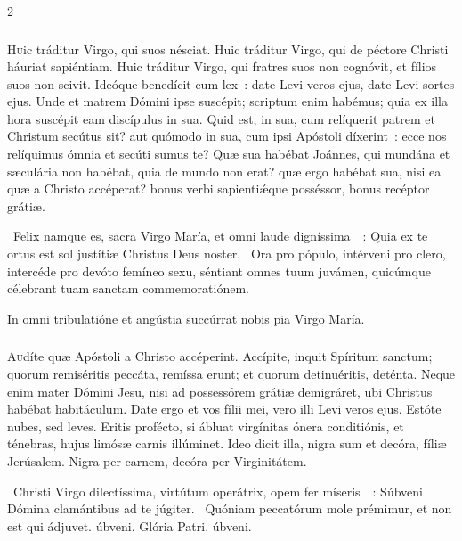 \documentclass[9pt,twoside]{extarticle}
\begin{document}
\begin{multicols}{2}
{\subsubsection*{\center {}}
\lettrine{H}uic tráditur Virgo, qui suos nésciat. Huic tráditur Virgo, qui de péctore Christi háuriat sapiéntiam. Huic tráditur Virgo, qui fratres suos non cognóvit, et fílios suos non scivit. Ideóque benedícit eum lex~: date Levi veros ejus, date Levi sortes ejus. Unde et matrem Dómini ipse suscépit; scriptum enim habémus; quia ex illa hora suscépit eam discípulus in sua. Quid est, in sua, cum relíquerit patrem et Christum secútus sit? aut quómodo in sua, cum ipsi Apóstoli díxerint~: ecce nos relíquimus ómnia et secúti sumus te? Quæ sua habébat Joánnes, qui mundána et sæculária non habébat, quia de mundo non erat? quæ ergo habébat sua, nisi ea quæ a Christo accéperat? bonus verbi sapientiǽque posséssor, bonus recéptor grátiæ.

\begin{tightlist}{}
\item {}~Felix namque es, sacra Virgo María, et omni laude digníssima~~: \textred{*} Quia ex te ortus est sol justítiæ Christus Deus noster.
~Ora pro pópulo, intérveni pro clero, intercéde pro devóto femíneo sexu, séntiant omnes tuum juvámen, quicúmque célebrant tuam sanctam commemoratiónem.
\item {\small {} In omni tribulatióne et angústia succúrrat nobis pia Virgo María.}
\end{tightlist}

\subsubsection*{\center {}}
\lettrine{A}udíte quæ Apóstoli a Christo accéperint. Accípite, inquit Spíritum sanctum; quorum remiséritis peccáta, remíssa erunt; et quorum detinuéritis, deténta. Neque enim mater Dómini Jesu, nisi ad possessórem grátiæ demigráret, ubi Christus habébat habitáculum. Date ergo et vos fílii mei, vero illi Levi veros ejus. Estóte nubes, sed leves. Eritis profécto, si ábluat virgínitas ónera conditiónis, et ténebras, hujus limósæ carnis illúminet. Ideo dicit illa, nigra sum et decóra, fíliæ Jerúsalem. Nigra per carnem, decóra per Virginitátem.

\begin{tightlist}{}
\item {}~Christi Virgo dilectíssima, virtútum operátrix, opem fer míseris~~: \textred{*} Súbveni Dómina clamántibus ad te júgiter.
~Quóniam peccatórum mole prémimur, et non est qui ádjuvet. úbveni. Glória Patri. úbveni.
\end{tightlist}

}
\end{multicols}
\end{document}
